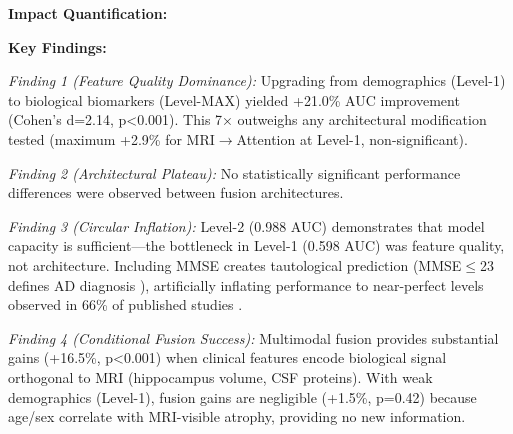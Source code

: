 \documentclass[conference]{IEEEtran}
\begin{document}
\textbf{Impact Quantification:}

\begin{table}[t]
\centering
\caption{Effect Size Decomposition}
\label{tab:effect-sizes}
\small
{}
\end{table}

\textbf{Key Findings:}

\textit{Finding 1 (Feature Quality Dominance):} Upgrading from demographics (Level-1) to biological biomarkers (Level-MAX) yielded +21.0\% AUC improvement (Cohen's d=2.14, p<0.001). This 7× outweighs any architectural modification tested (maximum +2.9\% for MRI$\rightarrow$Attention at Level-1, non-significant).

\textit{Finding 2 (Architectural Plateau):} No statistically significant performance differences were observed between fusion architectures.

\textit{Finding 3 (Circular Inflation):} Level-2 (0.988 AUC) demonstrates that model capacity is sufficient—the bottleneck in Level-1 (0.598 AUC) was feature quality, not architecture. Including MMSE creates tautological prediction (MMSE$\leq$23 defines AD diagnosis \cite{McKhann2011}), artificially inflating performance to near-perfect levels observed in 66\% of published studies \cite{Wen2020}.

\textit{Finding 4 (Conditional Fusion Success):} Multimodal fusion provides substantial gains (+16.5\%, p<0.001) when clinical features encode biological signal orthogonal to MRI (hippocampus volume, CSF proteins). With weak demographics (Level-1), fusion gains are negligible (+1.5\%, p=0.42) because age/sex correlate with MRI-visible atrophy, providing no new information.
\end{document}
